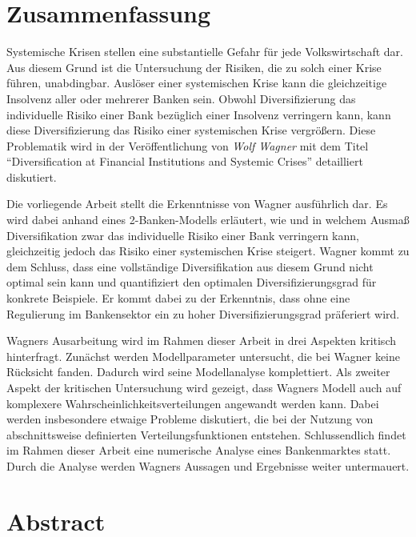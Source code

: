
\begingroup
\singlespacing{}
\chapter*{Zusammenfassung}
\endgroup

Systemische Krisen stellen eine substantielle Gefahr für jede Volkswirtschaft dar. Aus diesem Grund ist die Untersuchung der Risiken, die zu solch einer Krise führen, unabdingbar. Auslöser einer systemischen Krise kann die gleichzeitige Insolvenz aller oder mehrerer Banken sein. Obwohl Diversifizierung das individuelle Risiko einer Bank bezüglich einer Insolvenz verringern kann, kann diese Diversifizierung das Risiko einer systemischen Krise vergrößern. Diese Problematik wird in der Veröffentlichung von \emph{Wolf Wagner} mit dem Titel \mkbibquote{Diversification at Financial Institutions and Systemic Crises} detailliert diskutiert.

Die vorliegende Arbeit stellt die Erkenntnisse von Wagner ausführlich dar. Es wird dabei anhand eines 2-Banken-Modells erläutert, wie und in welchem Ausmaß Diversifikation zwar das individuelle Risiko einer Bank verringern kann, gleichzeitig jedoch das Risiko einer systemischen Krise steigert. Wagner kommt zu dem Schluss, dass eine vollständige Diversifikation aus diesem Grund nicht optimal sein kann und quantifiziert den optimalen Diversifizierungsgrad für konkrete Beispiele. Er kommt dabei zu der Erkenntnis, dass ohne eine Regulierung im Bankensektor ein zu hoher Diversifizierungsgrad präferiert wird.

Wagners Ausarbeitung wird im Rahmen dieser Arbeit in drei Aspekten kritisch hinterfragt. Zunächst werden Modellparameter untersucht, die bei Wagner keine Rücksicht fanden. Dadurch wird seine Modellanalyse komplettiert. Als zweiter Aspekt der kritischen Untersuchung wird gezeigt, dass Wagners Modell auch auf komplexere Wahrscheinlichkeitsverteilungen angewandt werden kann. Dabei werden insbesondere etwaige Probleme diskutiert, die bei der Nutzung von abschnittsweise definierten Verteilungsfunktionen entstehen. Schlussendlich findet im Rahmen dieser Arbeit eine numerische Analyse eines Bankenmarktes statt. Durch die Analyse werden Wagners Aussagen und Ergebnisse weiter untermauert.

\cleardoublepage
\begingroup
\singlespacing{}
\chapter*{Abstract}
\endgroup


